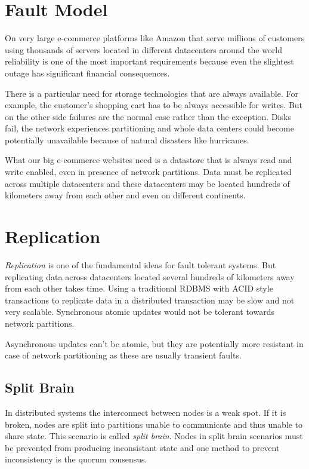 \section{Fault Model}


On very large e-commerce platforms like Amazon that serve
millions of customers using thousands of servers located
in different datacenters around the world reliability is one
of the most important requirements because even the slightest
outage has significant financial consequences. \cite{dynamo} 

There is a particular need for storage technologies that are 
always available. For example, the customer's shopping cart
has to be always accessible for writes. But on the other side failures 
are the normal case rather than the exception. Disks fail,
 the network experiences partitioning and
whole data centers could become potentially unavailable because of
natural disasters like hurricanes.

What our big e-commerce websites need is a datastore that is always
read and write enabled, even in presence of network partitions.
Data must be replicated across multiple datacenters and these
datacenters may be located hundreds of kilometers away from each
other and even on different continents.

\section{Replication}

\emph{Replication} is one of the fundamental ideas for fault
tolerant systems. But replicating data across datacenters located
several hundreds of kilometers away from each other takes time.
Using a traditional RDBMS with ACID style transactions to replicate
data in a distributed transaction may be slow and not very
scalable. Synchronous atomic updates would not be tolerant towards
network partitions.

Asynchronous updates can't be atomic, but they are potentially more
resistant in case of network partitioning as these are usually
transient faults.

\subsection{Split Brain}

In distributed systems the interconnect between nodes is a weak
spot. If it is broken, nodes are split into partitions unable to
communicate and thus unable to share state. This scenario is called
\emph{split brain}. Nodes in split brain scenarios must be
prevented from producing inconsistant state and one method to
prevent inconsistency is the quorum consensus.

